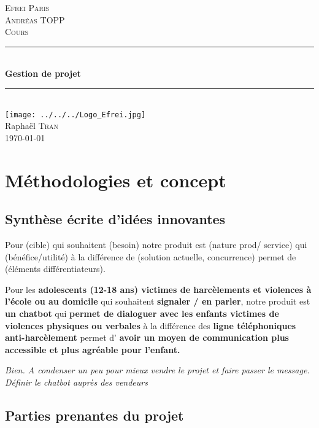 \documentclass{article}
\newcommand{\HRule}{\rule{\linewidth}{0.5mm}}
\begin{document}
\begin{titlepage}
\center

 \LARGE \textsc{Efrei Paris}
\\[1.5cm]
\Large \textsc{Andréas TOPP}
\\[0.5cm]
\large \textsc{Cours}
\\[0.5cm]
\HRule \\[0.4cm]
 {\Huge \bfseries Gestion de projet}\\[0.4cm] %
\HRule \\[1.4cm]

\texttt{[image: ../../../Logo\_Efrei.jpg]}  \\[1cm]

{\Large Raphaël \textsc{Tran}}  \\[0.5cm]
{\large \today } \\[2pt]

\end{titlepage}

\tableofcontents
\newpage

\section{Méthodologies et concept}

\subsection{Synthèse écrite d'idées innovantes}

Pour (cible) qui souhaitent (besoin) notre produit est (nature prod/ service) qui (bénéfice/utilité) à la différence de (solution actuelle, concurrence)  permet de (éléments différentiateurs). 

\medbreak

Pour les \textbf{adolescents (12-18 ans) victimes de harcèlements et violences à l'école ou au domicile} qui souhaitent \textbf{signaler / en parler}, notre produit est \textbf{un chatbot} qui \textbf{permet de dialoguer avec les enfants victimes de violences physiques ou verbales} à la différence des {\bf  ligne téléphoniques anti-harcèlement} permet d' \textbf{avoir un moyen de communication plus accessible et plus agréable pour l'enfant.} 

\textit{Bien. A condenser un peu pour mieux vendre le projet et faire passer le message. Définir le chatbot auprès des vendeurs}

\subsection{Parties prenantes du projet}
\end{document}
